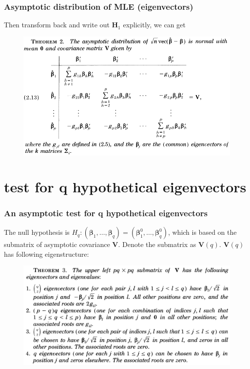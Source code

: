 \documentclass{beamer}
\begin{document}
\begin{frame}
	\frametitle{Asymptotic distribution of MLE (eigenvectors)}
	Then transform back and write out $\bm{H}_1$ explicitly, we can get
	\begin{figure}
		\includegraphics[width=0.9\linewidth]{image009.png}
	\end{figure}
\end{frame}

\section{test for q hypothetical eigenvectors}


\begin{frame}
	\frametitle{An asymptotic test for q hypothetical eigenvectors}
	The null hypothesis is $H_q: (\bm{\beta}_1,\ldots,\bm{\beta}_q) = (\bm{\beta}_1^0,\ldots,\bm{\beta}_q^0)$, which is based on the submatrix of asymptotic covariance $\bm{V}$. Denote the submatrix as $\bm{V}(q)$. $\bm{V}(q)$ has following eigenstructure:
	\begin{figure}
		\includegraphics[width=0.9\linewidth]{image010.png}
	\end{figure}
\end{frame}
\end{document}
